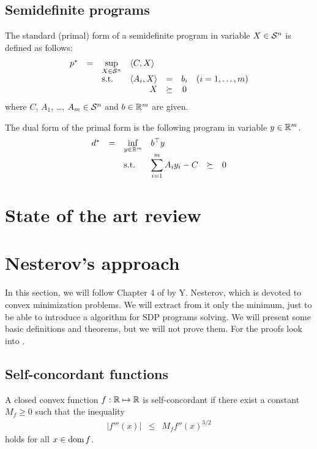 \subsection{Semidefinite programs}
The standard (primal) form of a semidefinite program in variable $X\in\mathcal{S}^n$ is defined as follows:
\begin{eqnarray}
  \begin{array}{rclrrclcll}
    p^* &=& \displaystyle \sup_{X\in\Sym^n} & \multicolumn{3}{l}{\langle C,X\rangle} \\
    && \text{s.t.} & \langle A_i, X\rangle &=& b_i & (i = 1,\ldots,m)\\
    &&& X &\succeq& 0
  \end{array}
\end{eqnarray}
where $C$, $A_1$, \ldots, $A_m \in \mathcal{S}^n$ and $b\in\mathbb{R}^m$ are given.

The dual form of the primal form is the following program in variable $y\in\mathbb{R}^m$.
\begin{eqnarray}
  \begin{array}{rclrrclcll}
    d^* &=& \displaystyle \inf_{y\in\R^m} & \multicolumn{3}{l}{b^\top y} \\
    && \text{s.t.} & \displaystyle \sum_{i=1}^m A_iy_i - C &\succeq& 0
  \end{array}\labeleq{SDP:prelim:dual}
\end{eqnarray}

\section{State of the art review}


\section{Nesterov's approach}
In this section, we will follow Chapter 4 of \cite{Nesterov-2004} by Y. Nesterov, which is devoted to convex minimization problems.
We will extract from it only the minimum, just to be able to introduce a algorithm for SDP programs solving.
We will present some basic definitions and theorems, but we will not prove them.
For the proofs look into \cite{Nesterov-2004}.

\subsection{Self-concordant functions}
\begin{definition}
  A closed convex function $f: \mathbb{R} \mapsto \mathbb{R}$ is self-concordant if there exist a constant $M_f \geq 0$ such that the inequality
  \begin{eqnarray}
    |f'''(x)| &\leq& M_f f''(x)^{3/2}
  \end{eqnarray}
  holds for all $x\in\operatorname{dom} f$.
\end{definition}


